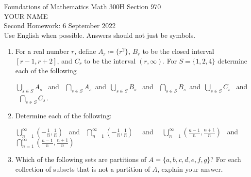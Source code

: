 \documentclass[12pt]{article}
\begin{document}
\LARGE 
\noindent
{\color{Maroon}Foundations of Mathematics \hfill Math 300H Section 970}\vspace{2pt}\\
\Large YOUR NAME\vspace{2pt}\\
\large
Second Homework: \hfill 6 September 2022\\
Use English when possible.  Answers should not just be symbols.
\normalsize\vspace{10pt}


\begin{enumerate}  %


\item  For a real number $r$, define $A_r\coloneqq\{r^2\}$,  $B_r$ to be the closed interval $[r{-}1, r{+}2]$, and $C_r$ to be the interval
  $(r,\infty)$.
  For $S=\{1,2,4\}$ determine each of the following 

  $\bigcup_{s\in S} A_s $ \ and \ $\bigcap_{s\in S} A_s $\ and\ 
  $\bigcup_{s\in S} B_s $ \ and \ $\bigcap_{s\in S} B_s $\ and\ 
  $\bigcup_{s\in S} C_s $ \ and \ $\bigcap_{s\in S} C_s $\,.


\item    Determine each of the  following:

  ${\displaystyle \bigcup_{n=1}^\infty \left(-\frac{1}{n},\frac{1}{n}\right)}$ \ and \ 
  ${\displaystyle \bigcap_{n=1}^\infty \left(-\frac{1}{n},\frac{1}{n}\right)}$ \ \ and \ \ 
  ${\displaystyle \bigcup_{n=1}^\infty \left(\frac{n{-}1}{n},\frac{n{+}1}{n}\right)}$ \ and \;\ 
  ${\displaystyle \bigcap_{n=1}^\infty \left(\frac{n{-}1}{n},\frac{n{+}1}{n}\right)}$
     

\item  Which of the following sets are partitions of $A=\{a,b,c,d,e,f,g\}$?
       For each collection of subsets that is not a partition of $A$, explain your answer.
  \begin{enumerate} 


\end{enumerate}
\end{enumerate}
\end{document}
